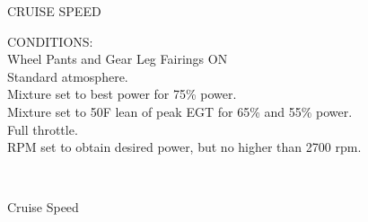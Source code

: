 \begin{figure}[t]
\begin{center}
\begin{perfhdr}CRUISE SPEED\\
\end{perfhdr}

\begin{minipage}{5in}
  \begin{flushleft}
    CONDITIONS:\\
    Wheel Pants and Gear Leg Fairings ON\\
    Standard atmosphere.\\
    Mixture set to best power for 75\% power.\\
    Mixture set to 50\textdegree F lean of peak EGT for 65\% and 55\% power.\\
    Full throttle.\\
    RPM set to obtain desired power, but no higher than 2700 rpm.\\
    \end{flushleft}
\end{minipage}\\
\vspace{5ex}

\end{center}  %
\caption{Cruise Speed}
\label{Cruise-speed}
\end{figure}


